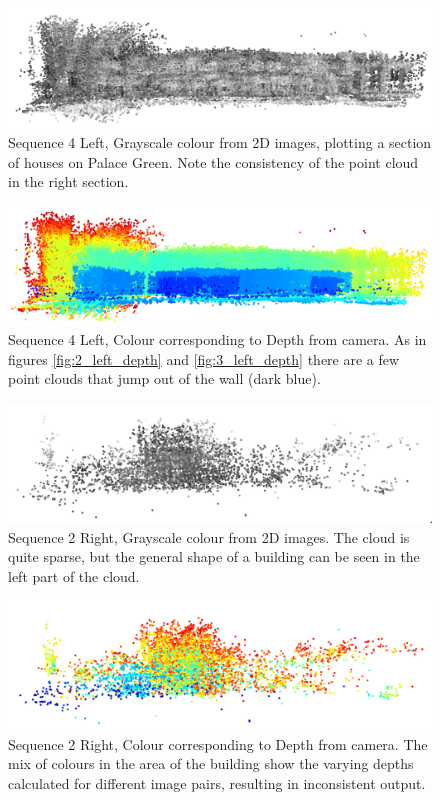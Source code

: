 \documentclass[11pt]{article}
\begin{document}
\begin{figure}[h]
	\centering
	\includegraphics[scale=0.6]{Sequence4Left_Grayscale}
	\caption{Sequence 4 Left, Grayscale colour from 2D images, plotting a section of houses on Palace Green. Note the consistency of the point cloud in the right section.}
	\label{fig:4_left_gray}
\end{figure}
\begin{figure}[h]
	\centering
	\includegraphics[scale=0.8]{Sequence4Left_Depth}
	\caption{Sequence 4 Left, Colour corresponding to Depth from camera. As in figures \ref{fig:2_left_depth} and \ref{fig:3_left_depth} there are a few point clouds that jump out of the wall (dark blue).}
	\label{fig:4_left_depth}
\end{figure}

\begin{figure}[h]
	\centering
	\includegraphics[scale=0.8]{Sequence2Right_Grayscale}
	\caption{Sequence 2 Right, Grayscale colour from 2D images. The cloud is quite sparse, but the general shape of a building can be seen in the left part of the cloud.}
	\label{fig:2_right_gray}
\end{figure}
\begin{figure}[h]
	\centering
	\includegraphics[scale=0.8]{Sequence2Right_Depth}
	\caption{Sequence 2 Right, Colour corresponding to Depth from camera. The mix of colours in the area of the building show the varying depths calculated for different image pairs, resulting in inconsistent output.}
	\label{fig:2_right_depth}
\end{figure}
\end{document}
